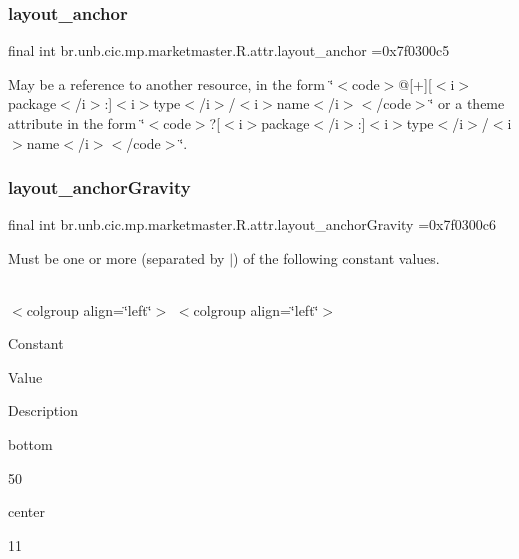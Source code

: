 \subsubsection{\texorpdfstring{layout\+\_\+anchor}{layout\_anchor}}
{\footnotesize\ttfamily final int br.\+unb.\+cic.\+mp.\+marketmaster.\+R.\+attr.\+layout\+\_\+anchor =0x7f0300c5\hspace{0.3cm}{\ttfamily [static]}}

May be a reference to another resource, in the form \char`\"{}$<$code$>$@\mbox{[}+\mbox{]}\mbox{[}$<$i$>$package$<$/i$>$\+:\mbox{]}$<$i$>$type$<$/i$>$/$<$i$>$name$<$/i$>$$<$/code$>$\char`\"{} or a theme attribute in the form \char`\"{}$<$code$>$?\mbox{[}$<$i$>$package$<$/i$>$\+:\mbox{]}$<$i$>$type$<$/i$>$/$<$i$>$name$<$/i$>$$<$/code$>$\char`\"{}. \mbox{\label{classbr_1_1unb_1_1cic_1_1mp_1_1marketmaster_1_1R_1_1attr_a63ff8dc978fe11018d9c48b0757472a5}} 
\subsubsection{\texorpdfstring{layout\+\_\+anchor\+Gravity}{layout\_anchorGravity}}
{\footnotesize\ttfamily final int br.\+unb.\+cic.\+mp.\+marketmaster.\+R.\+attr.\+layout\+\_\+anchor\+Gravity =0x7f0300c6\hspace{0.3cm}{\ttfamily [static]}}

Must be one or more (separated by \textquotesingle{}$\vert$\textquotesingle{}) of the following constant values.

\tabulinesep=1mm
\begin{longtabu} spread 0pt [c]{*{0}{|X[-1]}|}
\hline
\end{longtabu}
$<$colgroup align=\char`\"{}left\char`\"{}$>$ $<$colgroup align=\char`\"{}left\char`\"{}$>$ 

Constant

Value

Description 

bottom

50

center

11

